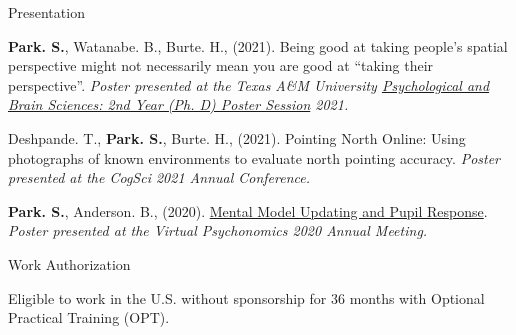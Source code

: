 \documentclass{resume} %
\begin{document}
\begin{rSection}{Presentation}
\begin{hangingpar}
	\end{hangingpar}

    \begin{hangingpar}
        
        \textbf{Park. S.}, Watanabe. B., Burte. H., (2021). 
        Being good at taking people's spatial perspective might not necessarily 
        mean you are good at “taking their perspective”. 
        \em{Poster presented at the Texas A\&M University
            \href{https://sites.google.com/tamu.edu/2021-2nd-year-poster/home}{Psychological
             and Brain Sciences: 2nd Year (Ph. D) Poster Session} 2021.}
        
    \end{hangingpar}
	
	\begin{hangingpar}
		
		 Deshpande. T., \textbf{Park. S.}, Burte. H., (2021). 
		 Pointing North Online: Using photographs of known environments to 
		 evaluate north pointing accuracy. 
		 \em{Poster presented at the CogSci 2021 Annual Conference.}
		
	\end{hangingpar}

	\begin{hangingpar}
		
		\textbf{Park. S.}, Anderson. B., (2020). \href{https://brittlab.uwaterloo.ca/2021/01/07/sungjoon-presents-psychonomics/}
		{Mental Model Updating and Pupil Response}. 
		\em{Poster presented at the Virtual Psychonomics 2020 Annual Meeting.}
		
	\end{hangingpar}
	
\end{rSection}

\begin{rSection}{Work Authorization}
    
    Eligible to work in the U.S. without sponsorship for 36 months with 
    Optional Practical Training (OPT).
    
\end{rSection}

\end{document}
